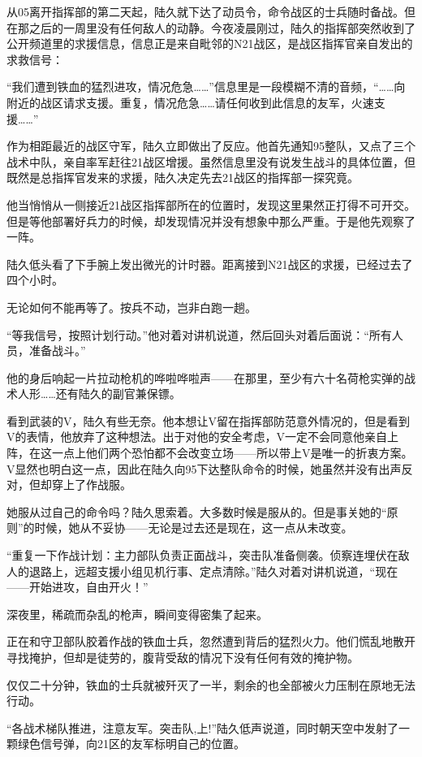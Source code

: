 从05离开指挥部的第二天起，陆久就下达了动员令，命令战区的士兵随时备战。但在那之后的一周里没有任何敌人的动静。今夜凌晨刚过，陆久的指挥部突然收到了公开频道里的求援信息，信息正是来自毗邻的N21战区，是战区指挥官亲自发出的求救信号：

“我们遭到铁血的猛烈进攻，情况危急……”信息里是一段模糊不清的音频，“……向附近的战区请求支援。重复，情况危急……请任何收到此信息的友军，火速支援……”

作为相距最近的战区守军，陆久立即做出了反应。他首先通知95整队，又点了三个战术中队，亲自率军赶往21战区增援。虽然信息里没有说发生战斗的具体位置，但既然是总指挥官发来的求援，陆久决定先去21战区的指挥部一探究竟。

他当悄悄从一侧接近21战区指挥部所在的位置时，发现这里果然正打得不可开交。但是等他部署好兵力的时候，却发现情况并没有想象中那么严重。于是他先观察了一阵。

陆久低头看了下手腕上发出微光的计时器。距离接到N21战区的求援，已经过去了四个小时。

无论如何不能再等了。按兵不动，岂非白跑一趟。

“等我信号，按照计划行动。”他对着对讲机说道，然后回头对着后面说：“所有人员，准备战斗。”

他的身后响起一片拉动枪机的哗啦哗啦声——在那里，至少有六十名荷枪实弹的战术人形……还有陆久的副官兼保镖。

看到武装的V，陆久有些无奈。他本想让V留在指挥部防范意外情况的，但是看到V的表情，他放弃了这种想法。出于对他的安全考虑，V一定不会同意他亲自上阵，在这一点上他们两个恐怕都不会改变立场——所以带上V是唯一的折衷方案。V显然也明白这一点，因此在陆久向95下达整队命令的时候，她虽然并没有出声反对，但却穿上了作战服。

她服从过自己的命令吗？陆久思索着。大多数时候是服从的。但是事关她的“原则”的时候，她从不妥协——无论是过去还是现在，这一点从未改变。

“重复一下作战计划：主力部队负责正面战斗，突击队准备侧袭。侦察连埋伏在敌人的退路上，远超支援小组见机行事、定点清除。”陆久对着对讲机说道，“现在——开始进攻，自由开火！”

深夜里，稀疏而杂乱的枪声，瞬间变得密集了起来。

正在和守卫部队胶着作战的铁血士兵，忽然遭到背后的猛烈火力。他们慌乱地散开寻找掩护，但却是徒劳的，腹背受敌的情况下没有任何有效的掩护物。

仅仅二十分钟，铁血的士兵就被歼灭了一半，剩余的也全部被火力压制在原地无法行动。

“各战术梯队推进，注意友军。突击队,上!”陆久低声说道，同时朝天空中发射了一颗绿色信号弹，向21区的友军标明自己的位置。

